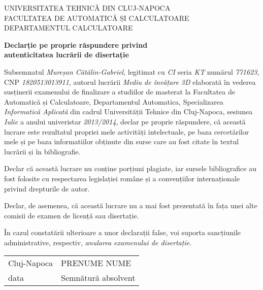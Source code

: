 \documentclass[12pt,a4paper,twoside]{report}
\begin{document}
\begin{titlepage}

\begin{center}
UNIVERSITATEA TEHNICĂ DIN CLUJ-NAPOCA\\
FACULTATEA DE AUTOMATICĂ ȘI CALCULATOARE\\
DEPARTAMENTUL CALCULATOARE\\
\end{center}

\vspace{4cm}

\begin{center}
\textbf{Declarție pe proprie răspundere privind \\ autenticitatea lucrării de disertație}

\end{center}

\vspace{1cm}

Subsemnatul \textit{Mureșan Cătălin-Gabriel}, legitimat cu \textit{CI} seria \textit{KT} numărul \textit{771623}, CNP \textit{1820513013911}, autorul lucrării \textit{Mediu de învățare 3D} elaborată în vederea susținerii examenului de finalizare a studiilor de masterat la Facultatea de Automatică și Calculatoare, Departamentul Automatica, Specializarea \textit{Informatică Aplicată} din cadrul Universității Tehnice din Cluj-Napoca, sesiunea \textit{Iulie} a anului univeristar \textit{2013/2014}, declar pe proprie răspundere, că această lucrare este rezultatul propriei mele activități intelectuale, pe baza cercetărilor mele și pe baza informatiilor obținute din surse care au fost citate în textul lucrării și în bibliografie.

Declar că această lucrare nu conține porțiuni plagiate, iar sursele bibliografice au fost folosite cu respectarea legislației române și a convențiilor internaționale privind drepturile de autor.

Declar, de asemenea, că această lucrare  nu a mai fost prezentată în fața unei alte comisii de examen de licență sau disertație.

În cazul constatării ulterioare a unor declarații false, voi suporta sancțiunile administrative, respectiv, \textit{anularea examenului de disertație}.


\vspace{3cm}

%
\begin{tabularx}{\textwidth}{lR}
Cluj-Napoca & PRENUME NUME\\
data  &    Semnătură absolvent \\
\end{tabularx}


\end{titlepage}
\end{document}
